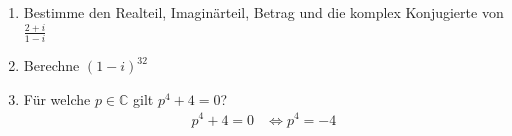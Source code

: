 \documentclass[11pt, a4paper]{article}
\newcommand{\abs}[1]{\left\lvert#1\right\rvert}
\newcommand{\acos}{\mathrm{acos}}
\newcommand{\asin}{\mathrm{asin}}
\newif\ifshowsolution
\begin{document}
	\begin{enumerate}
		\item Bestimme den Realteil, Imaginärteil, Betrag und die komplex Konjugierte von $\frac{2+i}{1-i}$
			\ifshowsolution
				\begin{align*}
					\frac{2+i}{1-i} &= \frac{(2+i) \cdot (\overline{1-i})}{(1-i) \cdot (\overline{1-i})} \\
					&= \frac{(2+i) \cdot (1+i)}{(1-i) \cdot (1+i)} \\
					&= \frac{2 + 3i + i^2}{1 - i^2} \\
					&= \frac{1 + 3i}{2} \\
					&= \frac{1}{2} + \frac{3}{2} i
				\end{align*}
				Realteil: $\frac{1}{2}$, Imaginärteil: $\frac{3}{2}$ \\
				Betrag: $\abs{\frac{1}{2} + \frac{3}{2} i} = \sqrt{(\frac{1}{2})^2 + (\frac{3}{2})^2} = \sqrt{\frac{1}{4} + \frac{9}{4}} = \sqrt{\frac{5}{2}}$ \\
				Komplex Konjugierte: $\overline{\frac{1}{2} + \frac{3}{2} i} = \frac{1}{2} - \frac{3}{2} i$
			\fi
		\item Berechne $(1-i)^{32}$
			\ifshowsolution
				\begin{align*}
					\intertext{Zunächst $1-i$ in Polarkoordinaten umrechnen.}
					r &= \abs{1-i} = \sqrt{1^2 + (-1)^2} = \sqrt{2} \\
					\alpha &= \acos{\frac{1}{\sqrt{2}}} = \asin{\frac{-1}{\sqrt{2}}} = \frac{7\pi}{4}
					\intertext{Es gilt also: $1-i = \sqrt{2} \left( \cos{\frac{7\pi}{4} + i \sin{\frac{7\pi}{4}}} \right)$. Potenzieren ist mit Polarkoordinaten einfach:}
					\left( \sqrt{2} \left( \cos{\frac{7\pi}{4} + i \sin{\frac{7\pi}{4}}} \right) \right)^{32} &= \sqrt{2}^{32} \left( \cos \left( 32 \cdot \frac{7\pi}{4} \right) + i \sin \left( 32 \cdot \frac{7\pi}{4} \right) \right) \\
					&= 2^{16} \left( \cos \left( 56\pi \right) + i \sin \left( 56\pi \right) \right) \\
					&= 2^{16} \left( \cos \left( 0 \right) + i \sin \left( 0 \right) \right) \\
					&= 2^{16} \left( 1 + 0i \right) \\
					&= 2^{16}
				\end{align*}
			\fi
		\item Für welche $p\in\mathbb{C}$ gilt $p^4 + 4 = 0$?
			\ifshowsolution
				\begin{align*}
					p^4 + 4 = 0 &\Leftrightarrow p^4 = -4 \\

\end{align*}
\end{enumerate}
\end{document}

